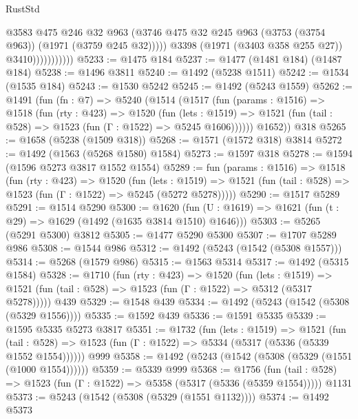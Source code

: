 \begin{lexlean}{RustStd}
\begin{coremodule}
{\begin{coremodule}
{{{{{{{{{{{{{                              @3583
                              @475
                              @246
                              @32
                              @963
                              (@3746
                                @475
                                @32
                                @245
                                @963
                                (@3753 (@3754 @963))
                                (@1971 (@3759 @245 @32)))))
                          @3398
                          (@1971 (@3403 @358 @255 @27))
                          @3410)))))))))))
@5233 := @1475 @184
@5237 := @1477 (@1481 @184) (@1487 @184)
@5238 := @1496 @3811
@5240 := @1492 (@5238 @1511)
@5242 := @1534 (@1535 @184)
@5243 := @1530 @5242
@5245 := @1492 (@5243 @1559)
@5262 := @1491
    (fun (fn : @7) =>
    @5240
      (@1514
        (@1517
          (fun (params : @1516) =>
          @1518
            (fun (rty : @423) =>
            @1520
              (fun (lets : @1519) =>
              @1521 (fun (tail : @528) => @1523 (fun (Γ : @1522) => @5245 @1606))))))
        @1652))
    @318
@5265 := @1658 (@5238 (@1509 @318))
@5268 := @1571 (@1572 @318) @3814
@5272 := @1492 (@1563 (@5268 @1580) @1584)
@5273 := @1597 @318
@5278 := @1594 (@1596 @5273 @3817 @1552 @1554)
@5289 := fun (params : @1516) =>
  @1518
    (fun (rty : @423) =>
    @1520
      (fun (lets : @1519) =>
      @1521 (fun (tail : @528) => @1523 (fun (Γ : @1522) => @5245 (@5272 @5278)))))
@5290 := @1517 @5289
@5291 := @1514 @5290
@5300 := @1620 (fun (U : @1619) => @1621 (fun (t : @29) => @1629 (@1492 (@1635 @3814 @1510) @1646)))
@5303 := @5265 (@5291 @5300) @3812
@5305 := @1477 @5290 @5300
@5307 := @1707 @5289 @986
@5308 := @1544 @986
@5312 := @1492 (@5243 (@1542 (@5308 @1557)))
@5314 := @5268 (@1579 @986)
@5315 := @1563 @5314
@5317 := @1492 (@5315 @1584)
@5328 := @1710
    (fun (rty : @423) =>
    @1520
      (fun (lets : @1519) =>
      @1521 (fun (tail : @528) => @1523 (fun (Γ : @1522) => @5312 (@5317 @5278)))))
    @439
@5329 := @1548 @439
@5334 := @1492 (@5243 (@1542 (@5308 (@5329 @1556))))
@5335 := @1592 @439
@5336 := @1591 @5335
@5339 := @1595 @5335 @5273 @3817
@5351 := @1732
    (fun (lets : @1519) =>
    @1521
      (fun (tail : @528) => @1523 (fun (Γ : @1522) => @5334 (@5317 (@5336 (@5339 @1552 @1554))))))
    @999
@5358 := @1492 (@5243 (@1542 (@5308 (@5329 (@1551 (@1000 @1554))))))
@5359 := @5339 @999
@5368 := @1756
    (fun (tail : @528) => @1523 (fun (Γ : @1522) => @5358 (@5317 (@5336 (@5359 @1554)))))
    @1131
@5373 := @5243 (@1542 (@5308 (@5329 (@1551 @1132))))
@5374 := @1492 @5373
}}}}}}}}}}}}}
\end{coremodule}}
\end{coremodule}
\end{lexlean}
